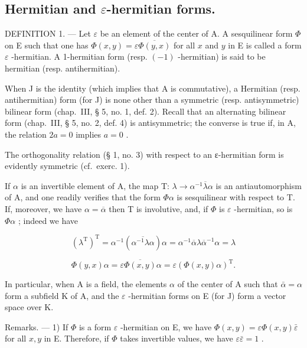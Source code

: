 \subsection{\texorpdfstring{Hermitian and \(\varepsilon\)-hermitian forms.}{Hermitian and epsilon-hermitian forms.}}

DEFINITION 1. --- Let \(\varepsilon\) be an element of the center of A. A sesquilinear form \(\Phi\) on E such that one has \(\Phi(x, y) = \varepsilon \overline{\Phi(y, x)}\) for all \(x\) and \(y\) in E is called a form \(\varepsilon\) -hermitian. A 1-hermitian form (resp. \((-1)\) -hermitian) is said to be hermitian (resp. antihermitian).

When J is the identity (which implies that A is commutative), a Hermitian (resp. antihermitian) form (for J) is none other than a symmetric (resp. antisymmetric) bilinear form (chap.~III, § 5, no. 1, def. 2). Recall that an alternating bilinear form (chap.~III, § 5, no. 2, def. 4) is antisymmetric; the converse is true if, in A, the relation \(2a = 0\) implies \(a = 0\) .

The orthogonality relation (§ 1, no. 3) with respect to an ε-hermitian form is evidently symmetric (cf.~exerc. 1).

If \(\alpha\) is an invertible element of A, the map T: \(\lambda \to \alpha^{-1}\overline{\lambda}\alpha\) is an antiautomorphism of A, and one readily verifies that the form \(\Phi\alpha\) is sesquilinear with respect to T. If, moreover, we have \(\alpha = \overline{\alpha}\) then T is involutive, and, if \(\Phi\) is \(\varepsilon\) -hermitian, so is \(\Phi\alpha\) ; indeed we have

\[
(\lambda^ {\mathrm{T}}) ^ {\mathrm{T}} = \alpha^ {- 1} (\overline {{\alpha^ {- 1} \lambda \alpha}}) \alpha = \alpha^ {- 1} \overline {{\alpha}} \lambda \overline {{\alpha}} ^ {- 1} \alpha = \lambda
\]

\[
\Phi (y, x) \alpha = \varepsilon \overline {{\Phi (x , y)}} \alpha = \varepsilon (\Phi (x, y) \alpha) ^ {\mathrm{T}}.
\]

In particular, when A is a field, the elements \(\alpha\) of the center of A such that \(\bar{\alpha} = \alpha\) form a subfield K of A, and the \(\varepsilon\) -hermitian forms on E (for J) form a vector space over K.

Remarks. --- 1) If \(\Phi\) is a form \(\varepsilon\) -hermitian on E, we have \(\Phi(x, y) = \varepsilon \Phi(x, y) \bar{\varepsilon}\) for all \(x, y\) in E. Therefore, if \(\Phi\) takes invertible values, we have \(\varepsilon \bar{\varepsilon} = 1\) .

